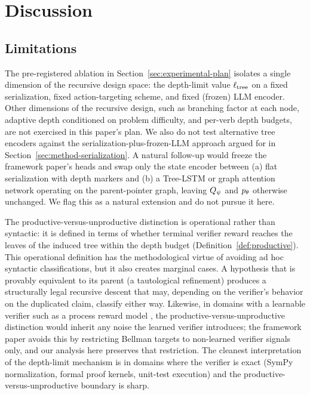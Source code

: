 \section{Discussion}
\label{sec:discussion}

\subsection{Limitations}
\label{sec:disc-limits}

The pre-registered ablation in Section~\ref{sec:experimental-plan} isolates
a single dimension of the recursive design space: the depth-limit value
$\ell_{\mathrm{tree}}$ on a fixed serialization, fixed action-targeting scheme, and
fixed (frozen) LLM encoder. Other dimensions of the recursive design,
such as branching factor at each node, adaptive depth conditioned on
problem difficulty, and per-verb depth budgets, are not exercised in this
paper's plan. We also do not test alternative tree encoders against the
serialization-plus-frozen-LLM approach argued for in
Section~\ref{sec:method-serialization}. A natural follow-up would freeze
the framework paper's heads and swap only the state encoder between (a)
flat serialization with depth markers and (b) a Tree-LSTM
\citep{tai2015improved} or graph attention network
\citep{velickovic2018gat} operating on the parent-pointer graph, leaving
$Q_{\psi}$ and $p_{\theta}$ otherwise unchanged. We flag this as a natural
extension and do not pursue it here.

The productive-versus-unproductive distinction is operational rather than
syntactic: it is defined in terms of whether terminal verifier reward
reaches the leaves of the induced tree within the depth budget
(Definition~\ref{def:productive}). This operational definition has the
methodological virtue of avoiding ad hoc syntactic classifications, but
it also creates marginal cases. A hypothesis that is provably equivalent
to its parent (a tautological refinement) produces a structurally legal
recursive descent that may, depending on the verifier's behavior on the
duplicated claim, classify either way. Likewise, in domains with a
learnable verifier such as a process reward model \citep{lightman2024verify},
the productive-versus-unproductive distinction would inherit any noise
the learned verifier introduces; the framework paper avoids this by
restricting Bellman targets to non-learned verifier signals only, and our
analysis here preserves that restriction. The cleanest interpretation of
the depth-limit mechanism is in domains where the verifier is exact
(SymPy normalization, formal proof kernels, unit-test execution) and the
productive-versus-unproductive boundary is sharp.

